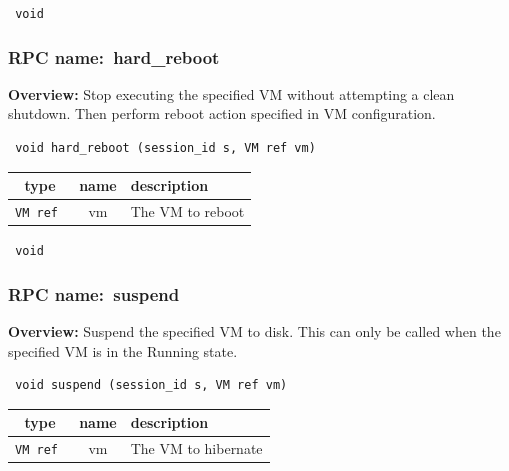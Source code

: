 {\tt 
void
}



\vspace{0.3cm}
\vspace{0.3cm}
\vspace{0.3cm}
\subsubsection{RPC name:~hard\_reboot}

{\bf Overview:} 
Stop executing the specified VM without attempting a clean shutdown. Then
perform reboot action specified in VM configuration.

\begin{verbatim} void hard_reboot (session_id s, VM ref vm)\end{verbatim}



 
\vspace{0.3cm}
\begin{tabular}{|c|c|p{7cm}|}
 \hline
{\bf type} & {\bf name} & {\bf description} \\ \hline
{\tt VM ref } & vm & The VM to reboot \\ \hline 

\end{tabular}

\vspace{0.3cm}

{\tt 
void
}



\vspace{0.3cm}
\vspace{0.3cm}
\vspace{0.3cm}
\subsubsection{RPC name:~suspend}

{\bf Overview:} 
Suspend the specified VM to disk.  This can only be called when the
specified VM is in the Running state.

\begin{verbatim} void suspend (session_id s, VM ref vm)\end{verbatim}



 
\vspace{0.3cm}
\begin{tabular}{|c|c|p{7cm}|}
 \hline
{\bf type} & {\bf name} & {\bf description} \\ \hline
{\tt VM ref } & vm & The VM to hibernate \\ \hline 

\end{tabular}

